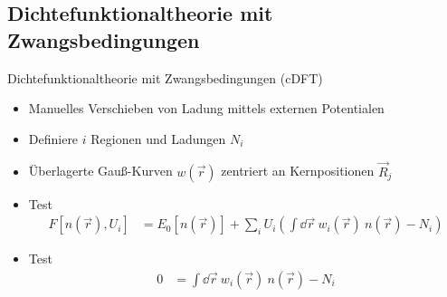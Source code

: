 \subsection{Dichtefunktionaltheorie mit Zwangsbedingungen}
\begin{frame}{Dichtefunktionaltheorie mit Zwangsbedingungen (cDFT)}
\hspace*{-1cm}
\begin{minipage}{0.8\textwidth}
	\vspace*{-1.5cm}
	\begin{itemize}
		\item Manuelles Verschieben von Ladung mittels externen Potentialen
		\item Definiere $i$ Regionen und Ladungen $N_i$
		\item Überlagerte Gauß-Kurven $w(\vec{r})$ zentriert an Kernpositionen $\vec{R}_j$
	\end{itemize}
\end{minipage}
\begin{minipage}{0.25\textwidth}
	\vspace*{-.8cm}
\end{minipage}
\hspace*{-1cm}
\begin{minipage}{\textwidth}
\vspace*{-1cm}
\begin{itemize}
	\item Test
	\begin{align*}
	F\left[n\left(\vec{r}\right), U_i\right] &= E_0\left[n\left(\vec{r}\right)\right] + 
	\sum_i U_i\left(\int\dd\vec{r}\ w_i\left(\vec{r}\right)\ n\left(\vec{r}\right) - N_i\right)
	\end{align*}
	\item Test
	\begin{align*}
	0 &= \int\dd\vec{r}\ w_i\left(\vec{r}\right)\ n\left(\vec{r}\right) - N_i
	\end{align*}
\end{itemize}
\end{minipage}
\end{frame}